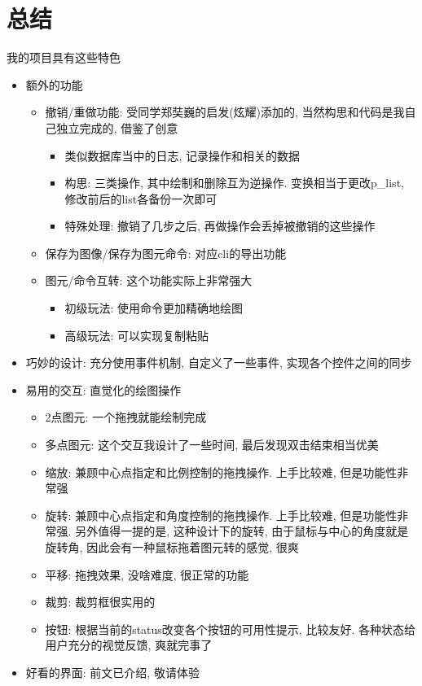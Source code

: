 \documentclass[a4paper,UTF8]{article}
\theoremstyle{definition}
\begin{document}
\section{总结}
我的项目具有这些特色
\begin{itemize}
  \item 额外的功能\begin{itemize}
    \item 撤销/重做功能: 受同学郑奘巍的启发(炫耀)添加的, 当然构思和代码是我自己独立完成的, 借鉴了创意\begin{itemize}
      \item 类似数据库当中的日志, 记录操作和相关的数据
      \item 构思: 三类操作, 其中绘制和删除互为逆操作. 变换相当于更改p\_list, 修改前后的list各备份一次即可
      \item 特殊处理: 撤销了几步之后, 再做操作会丢掉被撤销的这些操作
    \end{itemize}
    \item 保存为图像/保存为图元命令: 对应cli的导出功能
    \item 图元/命令互转: 这个功能实际上非常强大\begin{itemize}
      \item 初级玩法: 使用命令更加精确地绘图
      \item 高级玩法: 可以实现复制粘贴
    \end{itemize}
  \end{itemize}
  \item 巧妙的设计: 充分使用事件机制, 自定义了一些事件, 实现各个控件之间的同步
  \item 易用的交互: 直觉化的绘图操作\begin{itemize}
    \item 2点图元: 一个拖拽就能绘制完成
    \item 多点图元: 这个交互我设计了一些时间, 最后发现双击结束相当优美
    \item 缩放: 兼顾中心点指定和比例控制的拖拽操作. 上手比较难, 但是功能性非常强
    \item 旋转: 兼顾中心点指定和角度控制的拖拽操作. 上手比较难, 但是功能性非常强. 另外值得一提的是, 这种设计下的旋转, 由于鼠标与中心的角度就是旋转角, 因此会有一种鼠标拖着图元转的感觉, 很爽
    \item 平移: 拖拽效果, 没啥难度, 很正常的功能
    \item 裁剪: 裁剪框很实用的
    \item 按钮: 根据当前的status改变各个按钮的可用性提示, 比较友好. 各种状态给用户充分的视觉反馈, 爽就完事了
  \end{itemize}
  \item 好看的界面: 前文已介绍, 敬请体验
\end{itemize}

%

\end{document}
